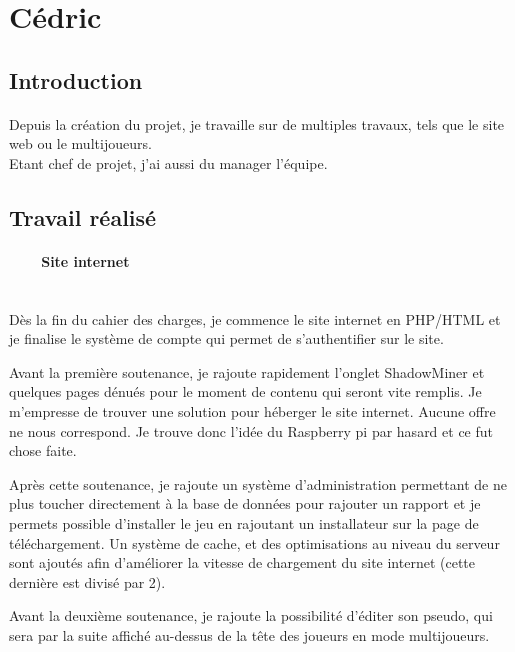 \documentclass[titlepage, 13px, a4paper]{report}
\begin{document}
\newpage
\section{Cédric}
\subsection{Introduction}
\paragraph{} \hspace{0pt}
Depuis la création du projet, je travaille sur de multiples travaux, tels que le site web ou le multijoueurs. \\
Etant chef de projet, j’ai aussi du manager l’équipe. \\


\subsection{Travail réalisé}
\paragraph{~~~~Site internet} \hspace{0pt} \\
Dès la fin du cahier des charges, je commence le site internet en PHP/HTML et je finalise le système de 
compte qui permet de s’authentifier sur le site.

Avant la première soutenance, je rajoute rapidement l’onglet ShadowMiner et quelques pages dénués pour 
le moment de contenu qui seront vite remplis. Je m’empresse de trouver une solution pour héberger le 
site internet. Aucune offre ne nous correspond. Je trouve donc l’idée du Raspberry pi par hasard et ce fut chose faite.

Après cette soutenance, je rajoute un système d’administration permettant de ne plus toucher directement 
à la base de données pour rajouter un rapport et je permets possible d’installer le jeu en rajoutant un 
installateur sur la page de téléchargement. Un système de cache, et des optimisations au niveau du serveur 
sont ajoutés afin d’améliorer la vitesse de chargement du site internet (cette dernière est divisé par 2).

Avant la deuxième soutenance, je rajoute la possibilité d’éditer son pseudo, qui sera par la suite affiché
 au-dessus de la tête des joueurs en mode multijoueurs. \\
\end{document}
